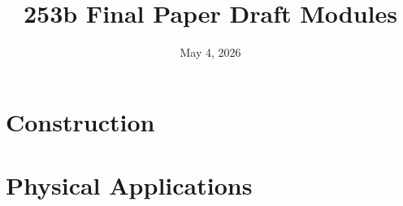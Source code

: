 \documentclass[11pt]{article}
\title{253b Final Paper Draft Modules}
\author{}
\date{May 4, 2026}
\theoremstyle{definition}
\theoremstyle{plain}
\begin{document}
\maketitle
\tableofcontents
\newpage

\part{Construction}






\part{Physical Applications}












\appendix





\end{document}
